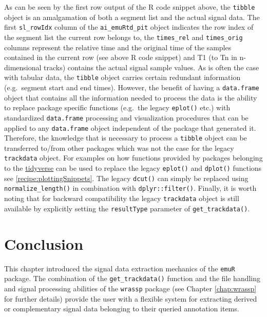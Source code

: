 \documentclass[
]{book}
\begin{document}
As can be seen by the first row output of the R code snippet above, the \texttt{tibble} object is an amalgamation of both a segment list and the actual signal data. The first \texttt{sl\_rowIdx} column of the \texttt{ai\_emuRtd\_pit} object indicates the row index of the segment list the current row belongs to, the \texttt{times\_rel} and \texttt{times\_orig} columns represent the relative time and the original time of the samples contained in the current row (see above R code snippet) and T1 (to Tn in n-dimensional tracks) contains the actual signal sample values. As is often the case with tabular data, the \texttt{tibble} object carries certain redundant information (e.g.~segment start and end times). However, the benefit of having a \texttt{data.frame} object that contains all the information needed to process the data is the ability to replace package specific functions (e.g.~the legacy \texttt{eplot()} etc.) with standardized \texttt{data.frame} processing and visualization procedures that can be applied to any \texttt{data.frame} object independent of the package that generated it. Therefore, the knowledge that is necessary to process a \texttt{tibble} object can be transferred to/from other packages which was not the case for the legacy \texttt{trackdata} object. For examples on how functions provided by packages belonging to the \href{https://www.tidyverse.org/}{tidyverse} can be used to replace the legacy \texttt{eplot()} and \texttt{dplot()} functions see \ref{recipe:plottingSnippets}. The legacy \texttt{dcut()} can simply be replaced using \texttt{normalize\_length()} in combination with \texttt{dplyr::filter()}. Finally, it is worth noting that for backward compatibility the legacy \texttt{trackdata} object is still available by explicitly setting the \texttt{resultType} parameter of \texttt{get\_trackdata()}.

\hypertarget{conclusion-3}{%
\section{Conclusion}\label{conclusion-3}}

This chapter introduced the signal data extraction mechanics of the \texttt{emuR} package. The combination of the \texttt{get\_trackdata()} function and the file handling and signal processing abilities of the \texttt{wrassp} package (see Chapter \ref{chap:wrassp} for further details) provide the user with a flexible system for extracting derived or complementary signal data belonging to their queried annotation items.
\end{document}
